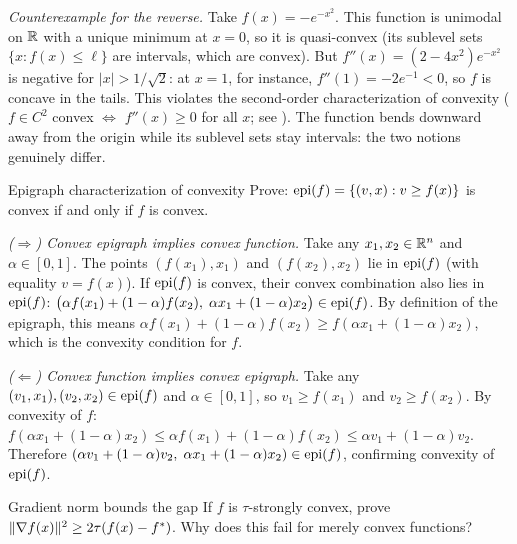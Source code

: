\textit{Counterexample for the reverse.}
Take $f(x) = -e^{-x^2}$.
This function is unimodal on $\mathbb{R}$ with a unique minimum at $x = 0$, so it is quasi-convex (its sublevel sets $\{x : f(x) \leq \ell\}$ are intervals, which are convex).
But $f''(x) = (2 - 4x^2)e^{-x^2}$ is negative for $|x| > 1/\sqrt{2}$: at $x = 1$, for instance, $f''(1) = -2e^{-1} < 0$, so $f$ is concave in the tails.
This violates the second-order characterization of convexity ($f \in C^2$ convex $\Leftrightarrow$ $f''(x) \geq 0$ for all $x$; see ).
The function bends downward away from the origin while its sublevel sets stay intervals: the two notions genuinely differ.

\begin{exercise}{Epigraph characterization of convexity}\label{ex:epigraph-convex}
	Prove: $\operatorname{epi}(f) = \{(v, x) : v \geq f(x)\}$ is convex if and only if $f$ is convex.
\end{exercise}

\solution
\textit{($\Rightarrow$) Convex epigraph implies convex function.}
Take any $x_1, x_2 \in \mathbb{R}^n$ and $\alpha \in [0, 1]$.
The points $(f(x_1), x_1)$ and $(f(x_2), x_2)$ lie in $\operatorname{epi}(f)$ (with equality $v = f(x)$).
If $\operatorname{epi}(f)$ is convex, their convex combination also lies in $\operatorname{epi}(f)$:
$\bigl(\alpha f(x_1) + (1-\alpha) f(x_2),\; \alpha x_1 + (1-\alpha) x_2\bigr) \in \operatorname{epi}(f)$.
By definition of the epigraph, this means
$\alpha f(x_1) + (1-\alpha) f(x_2) \geq f(\alpha x_1 + (1-\alpha) x_2)$,
which is the convexity condition for $f$.

\textit{($\Leftarrow$) Convex function implies convex epigraph.}
Take any $(v_1, x_1), (v_2, x_2) \in \operatorname{epi}(f)$ and $\alpha \in [0, 1]$, so $v_1 \geq f(x_1)$ and $v_2 \geq f(x_2)$.
By convexity of $f$:
$f(\alpha x_1 + (1-\alpha)x_2) \leq \alpha f(x_1) + (1-\alpha)f(x_2) \leq \alpha v_1 + (1-\alpha)v_2$.
Therefore $(\alpha v_1 + (1-\alpha)v_2,\; \alpha x_1 + (1-\alpha)x_2) \in \operatorname{epi}(f)$, confirming convexity of $\operatorname{epi}(f)$.

\begin{exercise}{Gradient norm bounds the gap}\label{ex:strong-convex-gap}
	If $f$ is $\tau$-strongly convex, prove $\lVert\nabla f(x)\rVert^2 \geq 2\tau(f(x) - f^*)$.
	Why does this fail for merely convex functions?
\end{exercise}

